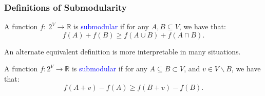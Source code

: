 \documentclass{beamer}
\newcommand{\emRed}[1][]{\textcolor{blue} #1}
\newcommand{\bbR}{\mathbb{R}}
\begin{document}
\begin{frame}
\frametitle{Definitions of Submodularity}
\begin{definition}
  \label{def:sub-concave}
  A function $f:~2^V \rightarrow \bbR$ is \emRed{submodular} if for any $A, B \subseteq V$, we have that:
  \begin{equation}
    \label{eq:sub-concave}
    f(A) + f(B) \geq f(A \cup B) + f(A \cap B).
  \end{equation}
\end{definition}

\pause
An alternate equivalent definition is more interpretable in many situations.

\begin{definition}
  \label{def:sub-diminishing}
  A function $f: 2^V \rightarrow \bbR$ is \emRed{submodular} if for any $A \subseteq B \subset V$, and $v \in V\backslash B$, we have that:
  \begin{equation}
    \label{eq:sub-diminishing}
    f(A + v) - f(A) \geq f(B + v) - f(B).
  \end{equation}
\end{definition}

\end{frame}




\end{document}
